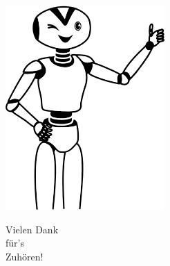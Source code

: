 \documentclass[aspectratio=169,x11names]{beamer}
\begin{document}
\begin{frame}[fragile]

\begin{multicols}{2}

\vspace*{73pt}
\includegraphics[scale=0.6]{images/Happy-Thumbs-Up-Robot.png} 

\columnbreak

\vspace*{40pt}

\Huge
\hspace*{-30pt}Vielen Dank\\ für's\\ Zuhören!
\end{multicols}
\end{frame}
\end{document}
